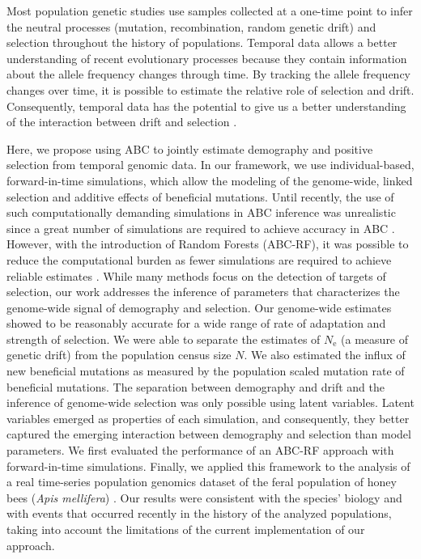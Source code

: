 \documentclass[a4paper, 12pt]{article}
\begin{document}
Most population genetic studies use samples collected at a one-time point to infer the neutral processes (mutation, recombination, random genetic drift) and selection throughout the history of populations. Temporal data allows a better understanding of recent evolutionary processes \citep[e.g.][]{Feder:2021bt, Dehasque:2020ku} because they contain information about the allele frequency changes through time. By tracking the allele frequency changes over time, it is possible to estimate the relative role of selection and drift. Consequently, temporal data has the potential to give us a better understanding of the interaction between drift and selection \citep[see for example,][]{Buffalo:2019ab, Buffalo:2020hq}. 

Here, we propose using ABC to jointly estimate demography and positive selection from temporal genomic data. In our framework, we use individual-based, forward-in-time simulations, which allow the modeling of the genome-wide, linked selection and additive effects of beneficial mutations. Until recently, the use of such computationally demanding simulations in ABC inference was unrealistic since a great number of simulations are required to achieve accuracy in ABC \citep{Frazier:2018kq}. However, with the introduction of Random Forests (ABC-RF), it was possible to reduce the computational burden as fewer simulations are required to achieve reliable estimates \citep{Pudlo:2016il, Raynal:2019jj}. While many methods focus on the detection of targets of selection, our work addresses the inference of parameters that characterizes the genome-wide signal of demography and selection. Our genome-wide estimates showed to be reasonably accurate for a wide range of rate of adaptation and strength of selection. We were able to separate the estimates of $N_{\mathrm{e}}$ (a measure of genetic drift) from the population census size $N$. We also estimated the influx of new beneficial mutations as measured by the population scaled mutation rate of beneficial mutations. The separation between demography and drift and the inference of genome-wide selection was only possible using latent variables. Latent variables emerged as properties of each simulation, and consequently, they better captured the emerging interaction between demography and selection than model parameters. We first evaluated the performance of an ABC-RF approach with forward-in-time simulations. Finally, we applied this framework to the analysis of a real time-series population genomics dataset of the feral population of honey bees (\textit{Apis mellifera}) \citep{Cridland:2018fx}. Our results were consistent with the species' biology and with events that occurred recently in the history of the analyzed populations, taking into account the limitations of the current implementation of our approach.
\end{document}

